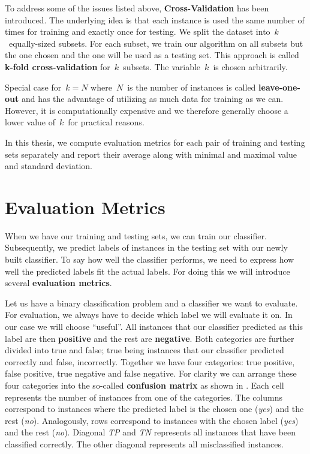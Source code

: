 To address some of the issues listed above, {\bf Cross-Validation} has been introduced.
The underlying idea is that each instance is used the same number of times for training 
and exactly once for testing.
We split the dataset into~$k$~equally-sized subsets.
For each subset, we train our algorithm on all subsets but the one chosen 
and the one will be used as a testing set.
This approach is called {\bf k-fold cross-validation} for~$k$~subsets.
The variable~$k$~is chosen arbitrarily.

Special case for~$k=N$ where~$N$~is the number of instances is called {\bf leave-one-out}
and has the advantage of 
utilizing as much data for training as we can.
However, it is computationally expensive and
we therefore generally choose a lower value of~$k$~for practical reasons.

In this thesis, we compute evaluation metrics for each pair of training and testing sets separately
and report their average along with minimal and maximal value and standard deviation.


\section{Evaluation Metrics}

When we have our training and testing sets, we can train our classifier.
Subsequently, we predict labels of instances in the testing set with our newly
built classifier.
To say how well the classifier performs, we need to express how well the predicted
labels fit the actual labels.
For doing this we will introduce several {\bf evaluation metrics}.

Let us have a binary classification problem and a classifier we want to evaluate.
For evaluation, we always have to decide which label we will evaluate it on.
In our case we will choose ``useful''.
All instances that our classifier predicted as this label are then {\bf positive} 
and the rest are {\bf negative}.
Both categories are further divided into true and false;
true being instances that our classifier predicted correctly and false, incorrectly.
Together we have four categories:
true positive, false positive, true negative and false negative.
For clarity we can arrange these four categories into the so-called {\bf confusion matrix} 
as shown in .
Each cell represents the number of instances from one of the categories.
The columns correspond to instances where the predicted label is the chosen one (\textit{yes}) and the rest (\textit{no}).
Analogously, rows correspond to instances with the chosen label (\textit{yes}) and the rest (\textit{no}).
Diagonal {\it TP} and {\it TN} represents all instances that have been classified correctly.
The other diagonal represents all misclassified instances.



